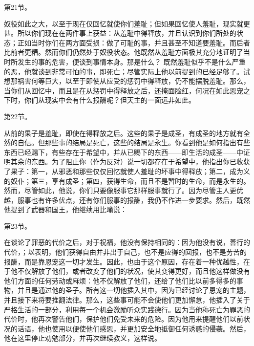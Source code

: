 第21节。\par

奴役如此之大，以至于现在仅回忆就使你们羞耻；但如果回忆使人羞耻，现实就更甚。所以你们现在在两件事上获益：从羞耻中得释放，并且认识到你们所处的状态；正如当时你们在两方面受损：做了可耻的事，并且甚至不知道要羞耻。而后者比前者更糟。然而你们仍然处于奴役状态。他既然从羞耻方面极其充分地证明了当时所发生的事的危害，便谈到事情本身。那是什么？ 既然羞耻似乎不是什么严重的恶，他就谈到非常可怕的事，即死亡；尽管实际上他以前提到的已经足够了。试想那祸害何等巨大，以至于即使从应受的惩罚中得释放，仍不能摆脱羞耻。那么，当你们从回忆中，而且是在从惩罚中得释放之后，还掩面脸红，何况在如此恩宠之下时，你们从现实中会有什么报酬呢？但天主的一面远非如此。\par

第22节。\par

从前的果子是羞耻，即使在得释放之后。这些的果子是成圣，有成圣的地方就有全然的自信。但那些事的结局是死亡，这些的结局是永生。你看到他是如何指出有些东西已经赐下，有些存在于希望中，并从已赐下的东西——即生活的成圣——中证明其余的东西。为了阻止你（作为反对）说一切都存在于希望中，他指出你已收获了果子：第一，从邪恶和那些仅仅回忆就使人羞耻的坏事中得释放；第二，成为义的奴仆；第三，享有成圣；第四，获得生命，而且不是暂时的生命，而是永生的。然而，尽管如此，他说，你们只要像服事它那样服事就行了。因为尽管主人更优越，服事也有许多优点，还有你们服事的报酬，我仍不作进一步要求。然后，既然他提到了武器和国王，他继续用比喻说：\par

第23节。\par

在谈论了罪恶的代价之后，对于祝福，他没有保持相同的：因为他没有说，善行的代价，；以表明，他们获得自由并非出于自己，也不是应得的回报，也不是劳苦的报酬，而是靠恩宠这一切才发生。因此，也由于这个原因，存在着一种优越性，在于他不仅解放了他们，或者改变了他们的状况，使其变得更好，而且他这样做没有他们方面的任何劳动或麻烦：他不仅解放了他们，还给了他们比以前多得多的事物，并且是通过他的圣子。所有这一切他插入其中，因为已经讨论了恩宠的主题，并且接下来将要推翻法律。那么，这些事可能不会使他们更加懈怠，他插入了关于严格生活的一部分，利用每一个机会激励听众实践德行。因为当他称死亡为罪恶的代价时，他再次警告他们，保护他们免受未来的危险。因为他用来提醒他们以前状况的话语，他也使用以便使他们感恩，并更加安全地抵御任何诱惑的侵袭。然后，他在这里停止劝勉部分，并再次继续教义，这样说。\newline{}\par

